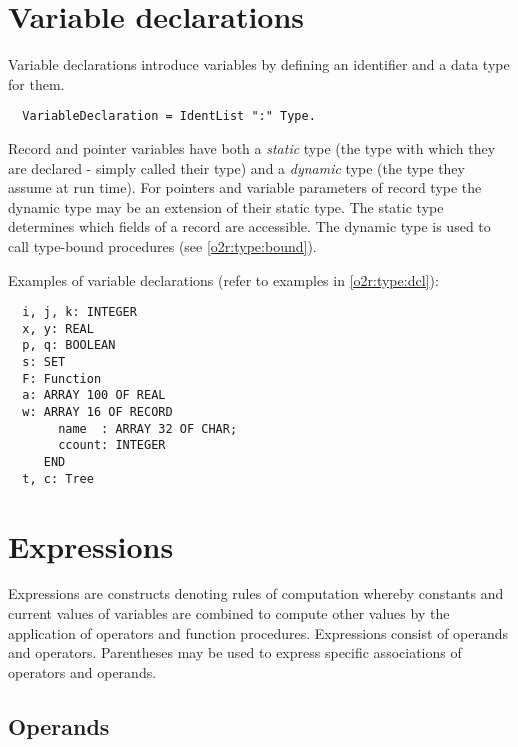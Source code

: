 \section{Variable declarations}\label{o2r:var}

Variable declarations introduce variables by defining an identifier
and a data type for them.
{\BNFsize
\begin{verbatim}
  VariableDeclaration = IdentList ":" Type.
\end{verbatim}}
Record and pointer variables have both a {\em static} type (the type
with which they are declared - simply called their type) and a {\em dynamic}
type (the type they assume at run time). For pointers and variable
parameters of record type the dynamic type may be an extension of
their static type. The static type determines which fields of a record
are accessible. The dynamic type is used to call type-bound procedures
(see \ref{o2r:type:bound}).

\noindent
Examples of variable declarations (refer to examples in \ref{o2r:type:dcl}):
\begin{verbatim}
  i, j, k: INTEGER
  x, y: REAL
  p, q: BOOLEAN
  s: SET
  F: Function
  a: ARRAY 100 OF REAL
  w: ARRAY 16 OF RECORD
       name  : ARRAY 32 OF CHAR;
       ccount: INTEGER
     END
  t, c: Tree
\end{verbatim}

\section{Expressions}\label{o2r:expr}

Expressions are constructs denoting rules of computation
whereby constants
and current values of variables are combined to compute other values
by the application of operators and function procedures. Expressions
consist of operands and operators. Parentheses may be used to express
specific associations of operators and operands.

\subsection{Operands}\label{o2r:operands}

